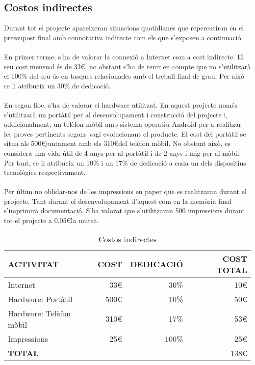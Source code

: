 \subsection{Costos indirectes}

Durant tot el projecte apareixeran situacions quotidianes que repercutiran en el pressupost final amb connotativa indirecte com els que s'exposen a continuació.
\\\\
En primer terme, s'ha de valorar la connexió a Internet com a cost indirecte. El seu cost mensual és de 33\euro, no obstant s'ha de tenir en compte que no s'utilitzarà el 100\% del seu ús en tasques relacionades amb el treball final de grau. Per això se li atribueix un 30\% de dedicació.
\\\\
En segon lloc, s'ha de valorar el hardware utilitzat. En aquest projecte només s'utilitzarà un portàtil per al desenvolupament i construcció del projecte i, addicionalment, un telèfon mòbil amb sistema operatiu Android per a realitzar les proves pertinents segons vagi evolucionant el producte. El cost del portàtil se situa als 500\euro\space juntament amb els 310\euro\space del telèfon mòbil. No obstant això, es considera una vida útil de 4 anys per al portàtil i de 2 anys i mig per al mòbil. Per tant, se li atribueix un 10\% i un 17\% de dedicació a cada un dels dispositius tecnològics respectivament.
\\\\
Per últim no oblidar-nos de les impressions en paper que es realitzaran durant el projecte. Tant durant el desenvolupament d'aquest com en la memòria final s'imprimirà documentació. S'ha valorat que s'utilitzaran 500 impressions durant tot el projecte a 0.05\euro\space la unitat.
\\
\begin{table}[H]
\centering
\begin{tabular}{ | l | r | r | r |}
\hline
\textbf{ACTIVITAT}&\textbf{COST}&\textbf{DEDICACIÓ}&\textbf{COST TOTAL} \\ \hline
Internet & 33\euro & 30\% & 10\euro \\ \hline
Hardware: Portàtil & 500\euro & 10\% & 50\euro \\ \hline
Hardware: Telèfon mòbil & 310\euro & 17\% & 53\euro \\ \hline
Impressions & 25\euro & 100\% & 25\euro \\ \hline
\textbf{TOTAL} & --- & --- & 138\euro \\
\hline
\end{tabular}
\caption{Costos indirectes}
\end{table}

